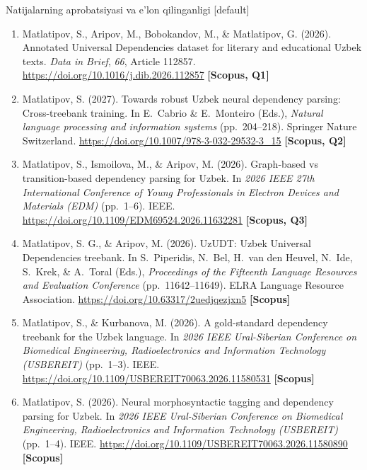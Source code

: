 \documentclass[aspectratio=169,11pt]{beamer}
\begin{document}
\begin{frame}{Natijalarning aprobatsiyasi va e’lon qilinganligi}
  [default]
  \scriptsize{}
  \begin{enumerate}\setlength{\itemsep}{4pt}
    \item Matlatipov, S., Aripov, M., Bobokandov, M., \& Matlatipov, G. (2026). Annotated Universal Dependencies dataset for literary and educational Uzbek texts. \textit{Data in Brief}, \textit{66}, Article 112857. \url{https://doi.org/10.1016/j.dib.2026.112857} \textbf{[Scopus, Q1]}
    \item Matlatipov, S. (2027). Towards robust Uzbek neural dependency parsing: Cross-treebank training. In E.~Cabrio \& E.~Monteiro (Eds.), \textit{Natural language processing and information systems} (pp.~204--218). Springer Nature Switzerland. \url{https://doi.org/10.1007/978-3-032-29532-3_15} \textbf{[Scopus, Q2]}
    \item Matlatipov, S., Ismoilova, M., \& Aripov, M. (2026). Graph-based vs transition-based dependency parsing for Uzbek. In \textit{2026 IEEE 27th International Conference of Young Professionals in Electron Devices and Materials (EDM)} (pp.~1--6). IEEE. \url{https://doi.org/10.1109/EDM69524.2026.11632281} \textbf{[Scopus, Q3]}
    \item Matlatipov, S. G., \& Aripov, M. (2026). UzUDT: Uzbek Universal Dependencies treebank. In S.~Piperidis, N.~Bel, H.~van den Heuvel, N.~Ide, S.~Krek, \& A.~Toral (Eds.), \textit{Proceedings of the Fifteenth Language Resources and Evaluation Conference} (pp.~11642--11649). ELRA Language Resource Association. \url{https://doi.org/10.63317/2uedjqezjxn5} \textbf{[Scopus]}
    \item Matlatipov, S., \& Kurbanova, M. (2026). A gold-standard dependency treebank for the Uzbek language. In \textit{2026 IEEE Ural-Siberian Conference on Biomedical Engineering, Radioelectronics and Information Technology (USBEREIT)} (pp.~1--3). IEEE. \url{https://doi.org/10.1109/USBEREIT70063.2026.11580531} \textbf{[Scopus]}
    \item Matlatipov, S. (2026). Neural morphosyntactic tagging and dependency parsing for Uzbek. In \textit{2026 IEEE Ural-Siberian Conference on Biomedical Engineering, Radioelectronics and Information Technology (USBEREIT)} (pp.~1--4). IEEE. \url{https://doi.org/10.1109/USBEREIT70063.2026.11580890} \textbf{[Scopus]}
  \end{enumerate}
\end{frame}
\end{document}
